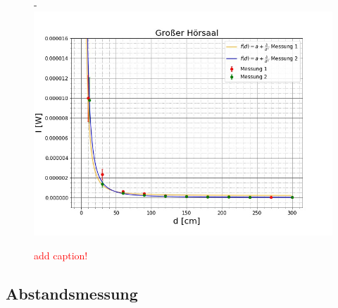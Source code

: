 \documentclass[titlepage,11pt,a4paper,ngerman]{article}
\begin{document}
$$\begin{figure}[ht]
-	\includegraphics[scale=0.6]{Bilder/bsp}
	\caption{\textcolor{red}{add caption!}}
	\label{GrHlin}
\end{figure}

\subsection{Abstandsmessung}
\end{document}
